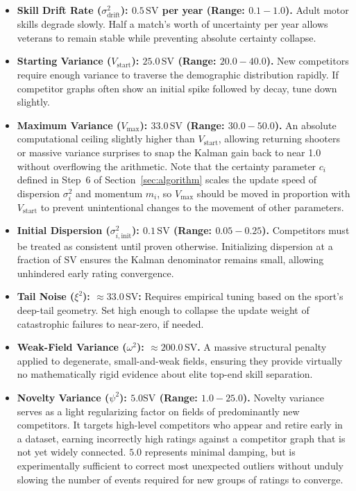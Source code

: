 \documentclass[12pt]{article}
\begin{document}
	\begin{itemize}
		\item \textbf{Skill Drift Rate ($\sigma_{\mathrm{drift}}^2$): $0.5\,\mathrm{SV}$ per year (Range: $0.1 - 1.0$).}
		Adult motor skills degrade slowly. Half a match's worth of uncertainty per year allows veterans to remain stable while preventing absolute certainty collapse.
		\item \textbf{Starting Variance ($V_{\mathrm{start}}$): $25.0\,\mathrm{SV}$ (Range: $20.0 - 40.0$).}
		New competitors require enough variance to traverse the demographic distribution rapidly. If competitor graphs often show an initial spike followed by decay, tune down slightly.
		\item \textbf{Maximum Variance ($V_{\max}$): $33.0\,\mathrm{SV}$ (Range: $30.0 - 50.0$).}
		An absolute computational ceiling slightly higher than $V_{\mathrm{start}}$, allowing returning shooters or massive variance surprises to snap the Kalman gain back to near 1.0 without overflowing the arithmetic. Note that the certainty parameter $c_i$ defined in Step~6 of Section~\ref{sec:algorithm} scales the update speed of dispersion $\sigma_i^2$ and momentum $m_i$, so $V_{\max}$ should be moved in proportion with $V_\mathrm{start}$ to prevent unintentional changes to the movement of other parameters.
		\item \textbf{Initial Dispersion ($\sigma_{i,\mathrm{init}}^2$): $0.1\,\mathrm{SV}$ (Range: $0.05 - 0.25$).}
		Competitors must be treated as consistent until proven otherwise. Initializing dispersion at a fraction of $\mathrm{SV}$ ensures the Kalman denominator remains small, allowing unhindered early rating convergence.
		\item \textbf{Tail Noise ($\xi^2$): $\approx 33.0\,\mathrm{SV}$:}
		Requires empirical tuning based on the sport's deep-tail geometry. Set high enough to collapse the update weight of catastrophic failures to near-zero, if needed.
		\item \textbf{Weak-Field Variance ($\omega^2$): $\approx 200.0\,\mathrm{SV}$.}
		A massive structural penalty applied to degenerate, small-and-weak fields, ensuring they provide virtually no mathematically rigid evidence about elite top-end skill separation.
		\item \textbf{Novelty Variance ($\psi^2$): $5.0 \mathrm{SV}$ (Range: $1.0 - 25.0$).}
		Novelty variance serves as a light regularizing factor on fields of predominantly new competitors. It targets high-level competitors who appear and retire early in a dataset, earning incorrectly high ratings against a competitor graph that is not yet widely connected. $5.0$ represents minimal damping, but is experimentally sufficient to correct most unexpected outliers without unduly slowing the number of events required for new groups of ratings to converge.

\end{itemize}
\end{document}
